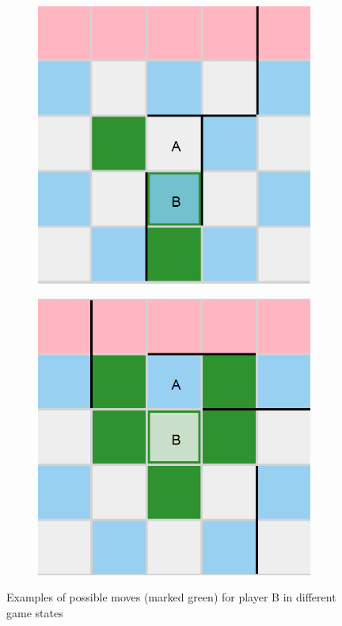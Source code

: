 \begin{figure}[!ht]
\begin{subfigure}{0.2\textwidth}
    \end{subfigure}
    \hfill
    \begin{subfigure}{0.2\textwidth}
        \includegraphics[width=\textwidth]{../img/GameBoard/move03.png}
    \end{subfigure}
    \hfill
    \begin{subfigure}{0.2\textwidth}
        \includegraphics[width=\textwidth]{../img/GameBoard/move04.png}
    \end{subfigure}
    \caption{Examples of possible moves (marked green) for player B in different game states}
    \label{fig:PossibleMoves}
\end{figure}